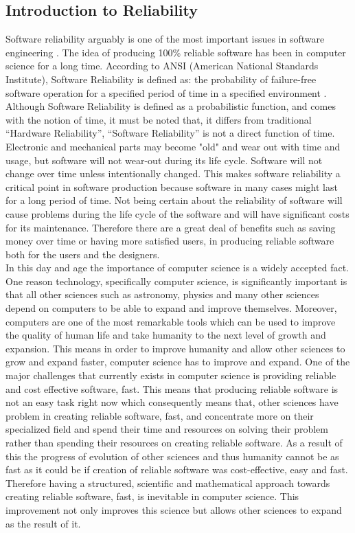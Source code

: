 \documentclass[10pt, a4paper, titlepage]{article}
\begin{document}
\subsection{Introduction to Reliability}

Software reliability arguably is one of the most important issues in software engineering \cite{ANSI_91}. The idea of producing 100\% reliable software has been in computer science for a long time. According to ANSI (American National Standards Institute), Software Reliability is defined as: the probability of failure-free software operation for a specified period of time in a specified environment \cite{ANSI_91}. Although Software Reliability is defined as a probabilistic function, and comes with the notion of time, it must be noted that, it  differs from traditional “Hardware Reliability”, “Software Reliability” is not a direct function of time. Electronic and mechanical parts may become "old" and wear out with time and usage, but software will not wear-out during its life cycle. Software will not change over time unless intentionally changed. This makes software reliability a critical point in software production because software in many cases might last for a long period of time. Not being certain about the reliability of software will cause problems during the life cycle of the software and will have significant costs for its maintenance.  Therefore there are a great deal of benefits such as saving money over time or having more satisfied users, in producing reliable software both for the users and the designers.\\

In this day and age the importance of computer science is a widely accepted fact. One reason technology, specifically computer science, is significantly important is that all other sciences such as astronomy, physics and many other sciences depend on computers to be able to expand and improve themselves. Moreover, computers are one of the most remarkable tools which can be used to improve the quality of human life and take humanity to the next level of growth and expansion. This means in order to improve humanity and allow other sciences to grow and expand faster, computer science has to improve and expand. One of the major challenges that currently exists in computer science is providing reliable and cost effective software, fast. This means that producing reliable software is not an easy task right now which consequently means that, other sciences have problem in creating reliable software, fast, and concentrate more on their specialized field and spend their time and resources on solving their problem rather than spending their resources on creating reliable software. As a result of this the progress of evolution of other sciences and thus humanity cannot be as fast as it could be if creation of reliable software was cost-effective, easy and fast. Therefore having a structured, scientific and mathematical approach towards creating reliable software, fast, is inevitable in computer science. This improvement not only improves this science but allows other sciences to expand as the result of it. \\
\end{document}
